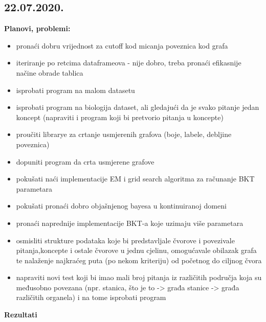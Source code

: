 		\subsection{22.07.2020.}
		\textbf{Planovi, problemi:}
		\begin{itemize}
			\item pronaći dobru vrijednost za cutoff kod micanja poveznica kod grafa
			\item iteriranje po retcima dataframeova - nije dobro, treba pronaći efikasnije načine obrade tablica
			\item isprobati program na malom datasetu
			\item isprobati program na biologija dataset, ali gledajući da je svako pitanje jedan koncept (napraviti i program koji bi pretvorio pitanja u koncepte)
			\item proučiti librarye za crtanje usmjerenih grafova (boje, labele, debljine poveznica)
			\item dopuniti program da crta usmjerene grafove
			\item pokušati naći implementacije EM i grid search algoritma za računanje BKT parametara
			\item pokušati pronaći dobro objašnjenog bayesa u kontinuiranoj domeni
			\item pronaći naprednije implementacije BKT-a koje uzimaju više parametara
			\item osmisliti strukture podataka koje bi predstavljale čvorove i povezivale pitanja,koncepte i ostale čvorove u jednu cjelinu, omogućavale obilazak grafa te nalaženje najkraćeg puta (po nekom kriteriju) od početnog do ciljnog čvora
			\item napraviti novi test koji bi imao mali broj pitanja iz različitih područja koja su međusobno povezana (npr. stanica, što je to -> građa stanice -> građa različitih organela) i na tome isprobati program\newline
		\end{itemize}
		\textbf{Rezultati}

